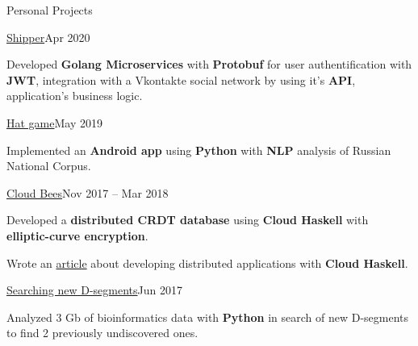 \documentclass{resume} %
\begin{document}

\begin{rSection}{Personal Projects}
    \begin{rSubsection}{\href{https://gitlab.com/shipr1505/backend}{Shipper}}{Apr 2020}{}{}
    \item Developed \textbf{Golang Microservices} with \textbf{Protobuf} for user authentification with \textbf{JWT}, integration with a Vkontakte social network by using it's \textbf{API}, application's business logic.
    \end{rSubsection}

    \begin{rSubsection}{\href{https://gitlab.com/SenchoPens/hatapp}{Hat game}}{May 2019}{}{}
    \item Implemented an \textbf{Android app} using \textbf{Python} with \textbf{NLP} analysis of Russian National Corpus.
    \end{rSubsection}

    \begin{rSubsection}{\href{https://github.com/SenchoPens/cloud-bees}{Cloud Bees}}{Nov 2017 -- Mar 2018}{}{}
    \item Developed a \textbf{distributed CRDT database} using \textbf{Cloud Haskell} with \textbf{elliptic-curve encryption}.
    \item Wrote an \href{https://github.com/mreluzeon/block-monad}{article} about developing distributed applications with \textbf{Cloud Haskell}.
    \end{rSubsection}

    \begin{rSubsection}{\href{https://github.com/SenchoPens/bioinformatic}{Searching new D-segments}}{Jun 2017}{}{}
    \item Analyzed 3 Gb of bioinformatics data with \textbf{Python} in search of new D-segments to find 2 previously undiscovered ones.
    \end{rSubsection}
\end{rSection}

\end{document}
